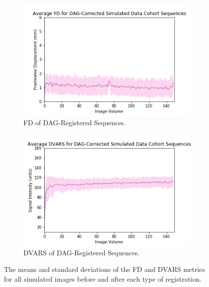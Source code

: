 \begin{figure}
	\begin{subfigure}{0.4\textwidth}
		\centering
		\includegraphics[width=1.0\textwidth]{6/figures/spectr-dag-fd-150.png}
		\caption{FD of DAG-Registered Sequences.}
	\end{subfigure}
	\hspace{0.05\textwidth}
	\begin{subfigure}{0.4\textwidth}
		\centering
		\includegraphics[width=1.0\textwidth]{6/figures/spectr-dag-dvars-150.png}
		\caption{DVARS of DAG-Registered Sequences.}
	\end{subfigure}
\caption{The means and standard deviations of the FD and DVARS metrics for all simulated images before and after each type of registration.}
\label{fig:spectr-power-dists}
\end{figure}

